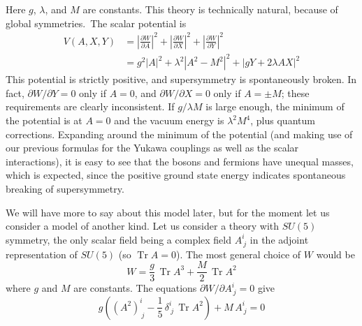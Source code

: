 Here $g$, $\lambda$, and $M$ are constants. This theory is technically natural,
because of global symmetries.\begingroup\renewcommand{\thefootnote}{\fnsymbol{footnote}}\footnotemark[1]\endgroup\ The scalar potential is
\begin{equation}
\begin{aligned}
V(A, X, Y) &= \left|\frac{\partial W}{\partial A}\right|^2 + \left|\frac{\partial W}{\partial X}\right|^2 + \left|\frac{\partial W}{\partial Y}\right|^2 \\
&= g^2 |A|^2 + \lambda^2 |A^2 - M^2|^2 + |gY + 2 \lambda A X|^2
\end{aligned}
\tag{24}
\end{equation}
This potential is strictly positive, and supersymmetry is spontaneously
broken. In fact, $\partial W/\partial Y = 0$ only if $A = 0$, and $\partial W/\partial X = 0$
only if $A = \pm M$; these requirements are clearly inconsistent. If
$g/\lambda M$ is large enough, the minimum of the potential is at $A = 0$ and
the vacuum energy is $\lambda^2 M^4$, plus quantum corrections. Expanding
around the minimum of the potential (and making use of our previous
formulas for the Yukawa couplings as well as the scalar interactions),
it is easy to see that the bosons and fermions have unequal masses,
which is expected, since the positive ground state energy indicates
spontaneous breaking of supersymmetry.

We will have more to say about this model later, but for the
moment let us consider a model of another kind. Let us consider a
theory with $SU(5)$ symmetry, the only scalar field being a complex
field $A^i_{\ j}$ in the adjoint representation of $SU(5)$ (so $\operatorname{Tr} A = 0$). The
most general choice of $W$ would be
\begin{equation}
W = \frac{g}{3}\, \operatorname{Tr} A^3 + \frac{M}{2}\, \operatorname{Tr} A^2
\tag{25}
\end{equation}
where $g$ and $M$ are constants. The equations $\partial W/\partial A^i_{\ j} = 0$ give
\begin{equation}
g\left((A^2)^i_{\ j} - \frac{1}{5}\, \delta^i_{\ j}\, \operatorname{Tr} A^2\right) + M\, A^i_{\ j} = 0
\tag{26}
\end{equation}

\begingroup
\renewcommand{\thefootnote}{\fnsymbol{footnote}}
\endgroup

